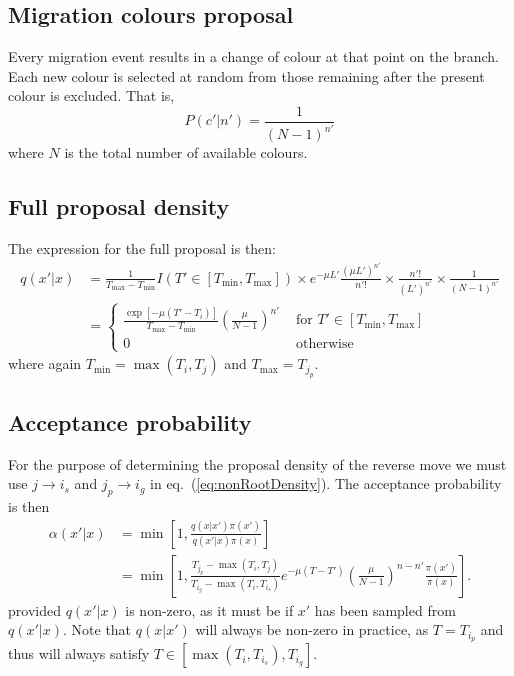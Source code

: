 \documentclass[a4paper,11pt]{article}
\begin{document}
\subsection{Migration colours proposal}

Every migration event results in a change of colour at that point on
the branch.  Each new colour is selected at random from those
remaining after the present colour is excluded. That is,
\begin{equation}
  P(c'|n') = \frac{1}{(N-1)^{n'}}
\end{equation}
where $N$ is the total number of available colours.

\subsection{Full proposal density}

The expression for the full proposal is then:
\begin{align}
  q(x'|x) &=\frac{1}{T_{\max}-T_{\min}}I(T'\in[T_{\min},T_{\max}])
  \times e^{-\mu L'}\frac{(\mu L')^{n'}}{n'!}
  \times \frac{n'!}{(L')^{n'}}
  \times \frac{1}{(N-1)^{n'}}\nonumber\\
&=\left\{\begin{array}{rl}
    \frac{\exp[-\mu(T'-T_i)]}{T_{\max}-T_{\min}}\left(\frac{\mu}{N-1}\right)^{n'} &
    \text{ for }T'\in[T_{\min},T_{\max}]\\
    0 & \text{ otherwise}
    \end{array}\right.
\label{eq:nonRootDensity}
\end{align}
where again $T_{\min}=\max(T_i,T_j)$ and $T_{\max}=T_{j_p}$.

\subsection{Acceptance probability}

For the purpose of determining the proposal density of the reverse
move we must use $j\rightarrow i_s$ and $j_p\rightarrow i_g$ in
eq.~(\ref{eq:nonRootDensity}). The acceptance probability is then
\begin{align}
  \alpha(x'|x) &=
  \min\left[1,\frac{q(x|x')\pi(x')}{q(x'|x)\pi(x)}\right]\nonumber\\
&=\min\left[1,\frac{T_{j_p}-\max(T_i,T_j)}{T_{i_g}-\max(T_i,T_{i_s})}e^{-\mu(T-T')}\left(\frac{\mu}{N-1}\right)^{n-n'}\frac{\pi(x')}{\pi(x)}\right].
\end{align}
provided $q(x'|x)$ is non-zero, as it must be if $x'$ has been sampled
from $q(x'|x)$. Note that $q(x|x')$ will always be non-zero in
practice, as $T=T_{i_p}$ and thus will always satisfy
$T\in[\max(T_i,T_{i_s}),T_{i_g}]$.
\end{document}
